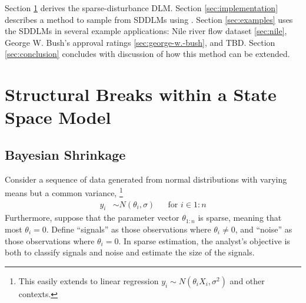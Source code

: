 \documentclass{article}
\begin{document}
Section \ref{sec:struct-breaks-state} derives the sparse-disturbance DLM.
Section \ref{sec:implementation} describes a method to sample from SDDLMs using \Stan{}.
Section \ref{sec:examples} uses the SDDLMs in several example applications: Nile river flow dataset \ref{sec:nile}, George W. Bush's approval ratings \ref{sec:george-w.-bush}, and TBD.
Section \ref{sec:conclusion} concludes with discussion of how this
method can be extended.

\section{Structural Breaks within a State Space Model}
\label{sec:struct-breaks-state}

\subsection{Bayesian Shrinkage}
\label{sec:bayesian-shrinkage}

Consider a sequence of data generated from normal distributions with varying means but a common variance,%
\footnote{
  This easily extends to linear regression $y_{i} \sim N(\theta_{i} X_{i}, \sigma^{2})$ and other contexts.
}
\begin{align}
  \label{eq:13}
  y_{i} & \sim N(\theta_{i}, \sigma) & & \text{for $i \in 1:n$}
\end{align}
Furthermore, suppose that the parameter vector $\theta_{1:n}$ is sparse, meaning that most $\theta_{i} = 0$.
Define ``signals'' as those observations where $\theta_{i} \neq 0$, and ``noise'' as those observations where $\theta_{i} = 0$.
In sparse estimation, the analyst's objective is both to classify signals and noise and estimate the size of the signals.
\end{document}
